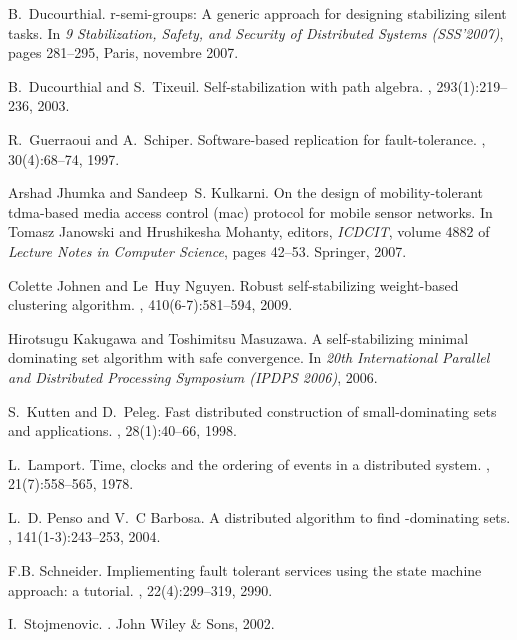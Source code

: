 \documentclass[11pt,english]{article}
\begin{document}
\begin{thebibliography}{10}
B.~Ducourthial.
\newblock r-semi-groups: A generic approach for designing stabilizing silent
  tasks.
\newblock In {\em 9 Stabilization, Safety, and Security of Distributed
  Systems (SSS'2007)}, pages 281--295, Paris, novembre 2007.

B.~Ducourthial and S.~Tixeuil.
\newblock Self-stabilization with path algebra.
, 293(1):219--236, 2003.

R.~Guerraoui and A.~Schiper.
\newblock Software-based replication for fault-tolerance.
, 30(4):68--74, 1997.

Arshad Jhumka and Sandeep~S. Kulkarni.
\newblock On the design of mobility-tolerant tdma-based media access control
  (mac) protocol for mobile sensor networks.
\newblock In Tomasz Janowski and Hrushikesha Mohanty, editors, {\em ICDCIT},
  volume 4882 of {\em Lecture Notes in Computer Science}, pages 42--53.
  Springer, 2007.

Colette Johnen and Le~Huy Nguyen.
\newblock Robust self-stabilizing weight-based clustering algorithm.
, 410(6-7):581--594, 2009.

Hirotsugu Kakugawa and Toshimitsu Masuzawa.
\newblock A self-stabilizing minimal dominating set algorithm with safe
  convergence.
\newblock In {\em 20th International Parallel and Distributed Processing
  Symposium (IPDPS 2006)}, 2006.

S.~Kutten and D.~Peleg.
\newblock Fast distributed construction of small-dominating sets and
  applications.
, 28(1):40--66, 1998.

L.~Lamport.
\newblock Time, clocks and the ordering of events in a distributed system.
, 21(7):558--565, 1978.

L.~D. Penso and V.~C Barbosa.
\newblock A distributed algorithm to find  -dominating sets.
, 141(1-3):243--253, 2004.

F.B. Schneider.
\newblock Impliementing fault tolerant services using the state machine
  approach: a tutorial.
, 22(4):299--319, 2990.

I.~Stojmenovic.
.
\newblock John Wiley \& Sons, 2002.

\end{thebibliography}
\end{document}
